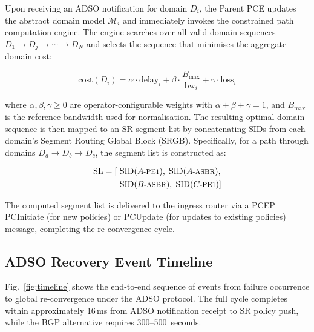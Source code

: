 \documentclass[conference]{IEEEtran}
\begin{document}
Upon receiving an ADSO notification for domain $D_i$, the Parent PCE
updates the abstract domain model $\mathcal{M}_i$ and immediately
invokes the constrained path computation engine. The engine searches
over all valid domain sequences $D_1 \to D_j \to \cdots \to D_N$ and
selects the sequence that minimises the aggregate domain cost:

\begin{equation}
  \text{cost}(D_i) =
    \alpha \cdot \text{delay}_i
  + \beta  \cdot \frac{B_{\max}}{\text{bw}_i}
  + \gamma \cdot \text{loss}_i
  \label{eq:cost}
\end{equation}

\noindent where $\alpha, \beta, \gamma \geq 0$ are operator-configurable
weights with $\alpha + \beta + \gamma = 1$, and $B_{\max}$ is the
reference bandwidth used for normalisation. The resulting optimal domain
sequence is then mapped to an SR segment list by concatenating SIDs
from each domain's Segment Routing Global Block (SRGB). Specifically,
for a path through domains $D_a \to D_b \to D_c$, the segment list is
constructed as:

\begin{align}
  \text{SL} = [&\ \text{SID}(A\text{\footnotesize-PE1}),\;
               \text{SID}(A\text{\footnotesize-ASBR}), \notag\\
              &\ \text{SID}(B\text{\footnotesize-ASBR}),\;
               \text{SID}(C\text{\footnotesize-PE1})]
  \label{eq:sidlist}
\end{align}

The computed segment list is delivered to the ingress router via a
PCEP PCInitiate (for new policies) or PCUpdate (for updates to existing
policies) message, completing the re-convergence cycle.

\subsection{ADSO Recovery Event Timeline}

Fig.~\ref{fig:timeline} shows the end-to-end sequence of events from
failure occurrence to global re-convergence under the ADSO protocol.
The full cycle completes within approximately 16\,ms from ADSO
notification receipt to SR policy push, while the BGP alternative
requires 300--500~seconds.
\end{document}
